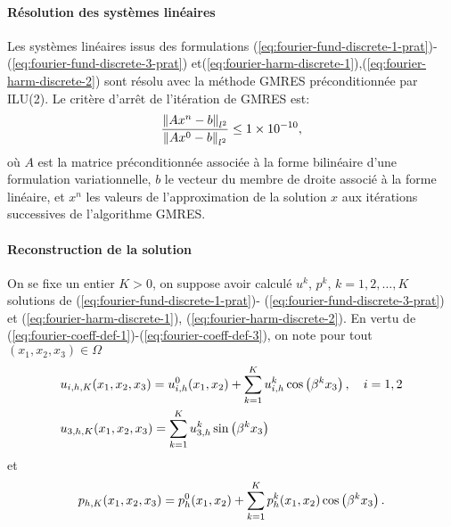 \paragraph{Résolution des systèmes linéaires}
Les systèmes linéaires issus des formulations
(\ref{eq:fourier-fund-discrete-1-prat})-(\ref{eq:fourier-fund-discrete-3-prat})
et(\ref{eq:fourier-harm-discrete-1}),(\ref{eq:fourier-harm-discrete-2})
sont résolu avec la méthode GMRES préconditionnée par ILU(2). Le
critère d'arrêt de l'itération de GMRES est:
\begin{equation}
  \frac{\left\lVert Ax^n - b \right\rVert_{l^2}}{\left\lVert Ax^0 - b \right\rVert_{l^2}} \leq \num{1e-10},
\end{equation}
où $A$ est la matrice préconditionnée associée à la forme bilinéaire
d'une formulation
variationnelle, $b$ le vecteur du membre de droite associé à la
forme linéaire, et $x^n$ les valeurs de l'approximation de la
solution $x$ aux itérations successives de l'algorithme GMRES.

\paragraph{Reconstruction de la solution}
On se fixe un entier $K > 0$, on suppose avoir calculé $u^k$, $p^k$, $k
= 1, 2,\dots, K$ solutions de (\ref{eq:fourier-fund-discrete-1-prat})-%
(\ref{eq:fourier-fund-discrete-3-prat}) et
(\ref{eq:fourier-harm-discrete-1}),
(\ref{eq:fourier-harm-discrete-2}). En vertu de
(\ref{eq:fourier-coeff-def-1})-(\ref{eq:fourier-coeff-def-3}), on note
pour tout $(x_1, x_2, x_3)\in \Omega$
\begin{align}
  &u_{i,h,K}(x_1, x_2, x_3) = u_{i,h}^0(x_1, x_2) + \sum_{k = 1}^K
  u_{i,h}^k \cos\left( \beta^k x_3 \right),\quad i = 1,2\label{eq:u-h-12}\\
  &u_{3,h,K}(x_1, x_2, x_3) = \sum_{k = 1}^K
  u_{3,h}^k \sin\left( \beta^k x_3 \right)\label{eq:u-h-3}
\end{align}
et
\begin{align}
  p_{h,K}(x_1, x_2, x_3) = p_h^0(x_1, x_2) + \sum_{k = 1}^K p_h^k(x_1,
  x_2) \cos\left( \beta^k x_3 \right).
\end{align}
